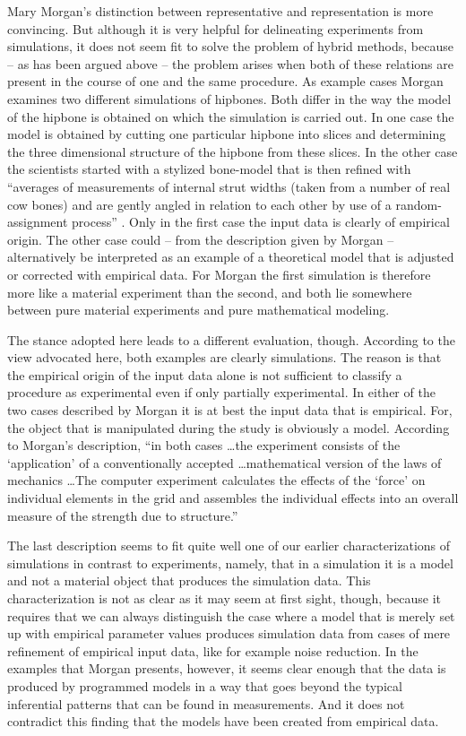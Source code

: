 \documentclass[12pt, a4paper]{article}
\numberwithin{equation}{section}
\begin{document}
Mary Morgan's distinction between representative and representation is more convincing. But although it is very helpful for delineating experiments from simulations, it does not seem fit to solve the problem of hybrid methods, because -- as has been argued above -- the problem arises when both of these relations are present in the course of one and the same procedure. As example cases Morgan examines two different simulations of hipbones. Both differ in the way the model of the hipbone is obtained on which the simulation is carried out. In one case the model is obtained by cutting one particular hipbone into slices and determining the three dimensional structure of the hipbone from these slices. In the other case the scientists started with a stylized bone-model that is then refined with ``averages of measurements of internal strut widths (taken from a number of real cow bones) and are gently angled in relation to each other by use of a random-assignment process'' \citep[p.\ 222]{morgan:2003}. Only in the first case the input data is clearly of empirical origin. The other case could -- from the description given by Morgan -- alternatively be interpreted as an example of a theoretical model that is adjusted or corrected with empirical data. For Morgan the first simulation is therefore more like a material experiment than the second, and both lie somewhere between pure material experiments and pure mathematical modeling.

The stance adopted here leads to a different evaluation, though. According to the view advocated here, both examples are clearly simulations. The reason is that the empirical origin of the input data alone is not sufficient to classify a procedure as experimental even if only partially experimental. In either of the two cases described by Morgan it is at best the input data that is empirical. For, the object that is manipulated during the study is obviously a model. According to  Morgan's description, ``in both cases \ldots the experiment consists of the `application' of a conventionally accepted \ldots mathematical version of the laws of mechanics \ldots The computer experiment calculates the effects of the `force' on individual elements in the grid and assembles the individual effects into an overall measure of the strength due to structure.''

The last description seems to fit quite well one of our earlier characterizations of simulations in contrast to experiments, namely, that in a simulation it is a model and not a material object that produces the simulation data. This characterization is not as clear as it may seem at first sight, though, because it requires that we can always distinguish the case where a model that is merely set up with empirical parameter values produces simulation data from cases of mere refinement of empirical input data, like for example noise reduction. In the examples that Morgan presents, however, it seems clear enough that the data is produced by programmed models in a way that goes beyond the typical inferential patterns that can be found in measurements. And it does not contradict this finding that the models have been created from empirical data.
\end{document}
